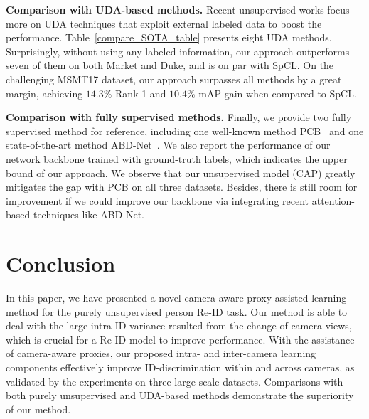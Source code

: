 \documentclass[letterpaper]{article} %
\begin{document}
\textbf{Comparison with UDA-based methods.} %
Recent unsupervised works focus more on UDA techniques that exploit external labeled data to boost the performance. Table~\ref{compare_SOTA_table} presents eight UDA methods. Surprisingly, without using any labeled information, our approach outperforms seven of them on both Market and Duke, and is on par with SpCL. On the challenging MSMT17 dataset, our approach surpasses all methods by a great margin, achieving $14.3\%$ Rank-1 and $10.4\%$ mAP gain when compared to SpCL.



\textbf{Comparison with fully supervised methods.} Finally, we provide two fully supervised method for reference, including one well-known method PCB~\cite{sun2018beyond} and one state-of-the-art method ABD-Net~\cite{chen2019abd}. We also report the performance of our network backbone trained with ground-truth labels, which indicates the upper bound of our approach. We observe that our unsupervised model (CAP) greatly mitigates the gap with PCB on all three datasets. Besides, there is still room for improvement if we could improve our backbone via integrating recent attention-based techniques like ABD-Net.



\section{Conclusion}
In this paper, we have presented a novel camera-aware proxy assisted learning method for the purely unsupervised person Re-ID task. Our method is able to deal with the large intra-ID variance resulted from the change of camera views, which is crucial for a Re-ID model to improve performance. With the assistance of camera-aware proxies, our proposed intra- and inter-camera learning components effectively improve ID-discrimination within and across cameras, as validated by the experiments on three large-scale datasets. Comparisons with both purely unsupervised and UDA-based methods demonstrate the superiority of our method.
\end{document}
